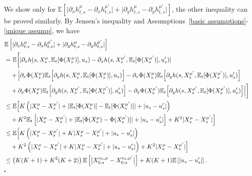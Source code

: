\documentclass[12pt]{article}
\theoremstyle{named}
\numberwithin{equation}{section}
\newenvironment{Proof}{\removelastskip\par\medskip \noindent{\em Proof.} \rm}{\penalty-20\null\hfill$\square$\par\medbreak}
\begin{document}
\begin{Proof}
    We show only for $\mathbb{E}\left[\lvert \partial_xh^{\mu}_{t,s} - \partial_xh^{\mu'}_{t,s} \rvert + \lvert \partial_yh^{\mu}_{t,s} - \partial_yh^{\mu'}_{t,s} \rvert\right]$, the other inequality can be proved similarly.
    By Jensen's inequality and Assumptions~\ref{basic assumptions}-\ref{unique assump}, we have
    \begin{align*}
                & \mathbb{E} \left[\lvert \partial_xh^{\mu}_{t,s} - \partial_xh^{\mu'}_{t,s} \rvert + \lvert \partial_yh^{\mu}_{t,s} - \partial_yh^{\mu'}_{t,s} \rvert\right] \\
                & = \mathbb{E} \biggl[ \lvert \partial_x h(s, X^{\mu}_s, \mathbb{E}_t [\Phi(X^{\mu}_s)], u_s) - \partial_x h(s, X^{\mu'}_s, \mathbb{E}_t [\Phi(X^{\mu'}_s)], u'_s) \rvert \\
                &\quad + \Bigl\lvert \partial_x\Phi(X^{\mu}_s)\mathbb{E}_t\Bigl[ \partial_y h(s, X^{\mu}_s, \mathbb{E}_t [\Phi(X^{\mu}_s)], u_s) \Bigr] - \partial_x\Phi(X^{\mu}_s)\mathbb{E}_t\Bigl[ \partial_y h(s, X^{\mu'}_s, \mathbb{E}_t [\Phi(X^{\mu'}_s)], u'_s) \Bigr]  \\
                & \quad +  \partial_x\Phi(X^{\mu}_s)\mathbb{E}_t\Bigl[ \partial_y h(s, X^{\mu'}_s, \mathbb{E}_t [\Phi(X^{\mu'}_s)], u'_s) \Bigr] - \partial_x\Phi(X^{\mu'}_s)\mathbb{E}_t\Bigl[ \partial_y h(s, X^{\mu'}_s, \mathbb{E}_t [\Phi(X^{\mu'}_s)], u'_s) \Bigr] \Bigr\rvert \biggr] \\
                & \leq \mathbb{E} \Bigl[ K \left( \lvert X^{\mu}_s - X^{\mu'}_s \rvert + \lvert \mathbb{E}_t [\Phi(X^{\mu}_s)] - \mathbb{E}_t [\Phi(X^{\mu'}_s)] \rvert + \lvert u_s -u'_s \rvert \right) \\
                & \quad + K^2 \mathbb{E}_t \left[ \lvert X^{\mu}_s - X^{\mu'}_s \rvert + \lvert \mathbb{E}_t [\Phi(X^{\mu}_s) - \Phi(X^{\mu'}_s)] \rvert + \lvert u_s - u'_s \rvert \right] + K^2 \lvert X^{\mu}_s - X^{\mu'}_s \rvert \Bigr]\\
                & \leq \mathbb{E} \Bigl[ K \left( \lvert X^{\mu}_s - X^{\mu'}_s \rvert + K \lvert  X^{\mu}_s-X^{\mu'}_s \rvert + \lvert u_s -u'_s \rvert \right) \\
                & \quad + K^2  \left( \lvert X^{\mu}_s - X^{\mu'}_s \rvert + K\lvert  X^{\mu}_s - X^{\mu'}_s \rvert + \lvert u_s - u'_s \rvert \right) + K^2 \lvert X^{\mu}_s - X^{\mu'}_s \rvert \Bigr]\\
        &  \leq \left(K(K + 1) + K^2(K+2)\right) \mathbb{E} \left[\big| X^{x_0,\mu}_{0,s} - X^{x_0,\mu'}_{0,s} \big|\right] + K(K+1) \mathbb{E} \left[ \lvert u_{s} - u'_{s} \rvert\right].
    \end{align*}
\end{Proof}
\end{document}
